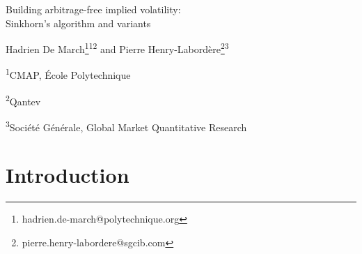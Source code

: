 \documentclass{amsart}%
\makeatletter
\theoremstyle{definition}
\theoremstyle{remark}
\newcommand{\authorfootnotes}{\renewcommand\thefootnote{\@fnsymbol\c@footnote}}%
\makeatother
\begin{document}



\begin{center}
  \LARGE 
  Building arbitrage-free implied volatility: \\ Sinkhorn's algorithm and variants \par \bigskip

  \normalsize
  \authorfootnotes
  Hadrien De March\footnote{hadrien.de-march@polytechnique.org}\textsuperscript{1}\textsuperscript{2} and Pierre Henry-Labord\`ere\footnote{pierre.henry-labordere@sgcib.com}\textsuperscript{3} \par \bigskip

  \textsuperscript{1}CMAP, \'Ecole Polytechnique \par
  \textsuperscript{2}Qantev\par
  \textsuperscript{3}Soci\'et\'e G\'en\'erale, Global Market Quantitative Research\par \bigskip

  
\end{center}

\begin{abstract} We consider the classical problem of building an arbitrage-free  implied volatility surface from bid-ask quotes. We design a fast numerical procedure, for which we prove the convergence, based on  the Sinkhorn algorithm that has been recently used to solve efficiently (martingale) optimal transport problems.
\end{abstract}

\section{Introduction}
\end{document}
